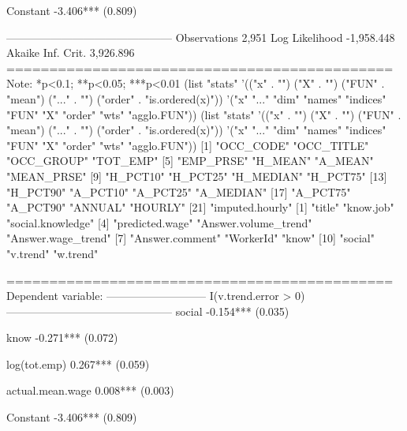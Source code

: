 Constant                   -3.406***         
                            (0.809)          
                                             
---------------------------------------------
Observations                 2,951           
Log Likelihood            -1,958.448         
Akaike Inf. Crit.          3,926.896         
=============================================
Note:             *p<0.1; **p<0.05; ***p<0.01
(list "stats" '(("x" . "") ("X" . "") ("FUN" . "mean") ("..." . "") ("order" . "is.ordered(x)")) '("x" "..." "dim" "names" "indices" "FUN" "X" "order" "wts" "agglo.FUN"))
(list "stats" '(("x" . "") ("X" . "") ("FUN" . "mean") ("..." . "") ("order" . "is.ordered(x)")) '("x" "..." "dim" "names" "indices" "FUN" "X" "order" "wts" "agglo.FUN"))
 [1] "OCC_CODE"       "OCC_TITLE"      "OCC_GROUP"      "TOT_EMP"       
 [5] "EMP_PRSE"       "H_MEAN"         "A_MEAN"         "MEAN_PRSE"     
 [9] "H_PCT10"        "H_PCT25"        "H_MEDIAN"       "H_PCT75"       
[13] "H_PCT90"        "A_PCT10"        "A_PCT25"        "A_MEDIAN"      
[17] "A_PCT75"        "A_PCT90"        "ANNUAL"         "HOURLY"        
[21] "imputed.hourly"
 [1] "title"               "know.job"            "social.knowledge"   
 [4] "predicted.wage"      "Answer.volume_trend" "Answer.wage_trend"  
 [7] "Answer.comment"      "WorkerId"            "know"               
[10] "social"              "v.trend"             "w.trend"            

=============================================
                      Dependent variable:    
                  ---------------------------
                     I(v.trend.error > 0)    
---------------------------------------------
social                     -0.154***         
                            (0.035)          
                                             
know                       -0.271***         
                            (0.072)          
                                             
log(tot.emp)               0.267***          
                            (0.059)          
                                             
actual.mean.wage           0.008***          
                            (0.003)          
                                             
Constant                   -3.406***         
                            (0.809)          
                                             
